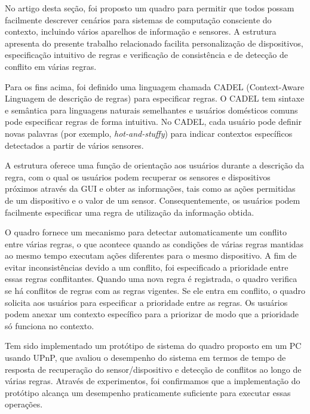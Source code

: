 \documentclass[12pt,a4paper,compsoc]{IEEEtran}
\begin{document}
  No artigo desta seção, foi proposto um quadro para permitir que todos possam facilmente descrever
  cenários para sistemas de computação consciente do contexto, incluindo vários aparelhos de
  informação e sensores. A estrutura apresenta do presente trabalho relacionado facilita
  personalização de dispositivos, especificação intuitivo de regras e verificação de consistência e de
  detecção de conflito em várias regras.
  
  Para os fins acima, foi definido uma linguagem chamada CADEL (Context-Aware Linguagem de descrição
  de regras) para especificar regras. O CADEL tem sintaxe e semântica para linguagens naturais
  semelhantes e usuários domésticos comuns pode especificar regras de forma intuitiva. No CADEL, cada
  usuário pode definir novas palavras (por exemplo, \textit{hot-and-stuffy}) para indicar contextos
  específicos detectados a partir de vários sensores.
  
  A estrutura oferece uma função de orientação aos usuários durante a descrição da regra, com o qual
  os usuários podem recuperar os sensores e dispositivos próximos através da GUI e obter as 
  informações, tais como as ações permitidas de um dispositivo e o valor de um sensor. 
  Consequentemente, os usuários podem facilmente especificar uma regra de utilização da informação
  obtida.
  
  O quadro fornece um mecanismo para detectar automaticamente um conflito entre várias regras, o que
  acontece quando as condições de várias regras mantidas ao mesmo tempo executam ações diferentes para
  o mesmo dispositivo. A fim de evitar inconsistências devido a um conflito, foi especificado a
  prioridade entre essas regras conflitantes. Quando uma nova regra é registrada, o quadro verifica se
  há conflitos de regras com as regras vigentes. Se ele entra em conflito, o quadro solicita aos 
  usuários para especificar a prioridade entre as regras. Os usuários podem anexar um contexto 
  específico para a priorizar de modo que a prioridade só funciona no contexto.
  
  Tem sido implementado um protótipo de sistema do quadro proposto em um PC usando UPnP, que
  avaliou o desempenho do sistema em termos de tempo de resposta de recuperação do
  sensor/dispositivo e detecção de conflitos ao longo de várias regras. Através de experimentos,
  foi confirmamos que a implementação do protótipo alcança um desempenho praticamente suficiente
  para executar essas operações.


\end{document}
